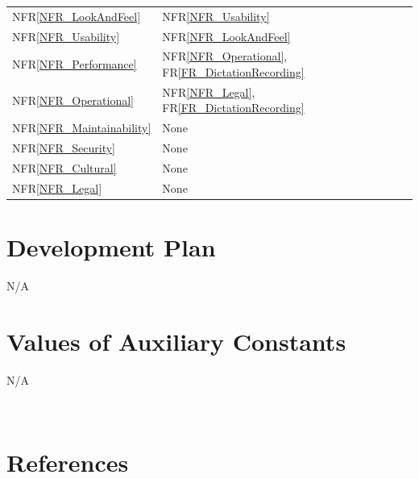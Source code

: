 \documentclass[12pt]{article}
\begin{document}
\begin{tabularx}{\textwidth}{p{3cm}p{2cm}X}
  NFR\ref{NFR_LookAndFeel} & NFR\ref{NFR_Usability} \\  

  NFR\ref{NFR_Usability} &  NFR\ref{NFR_LookAndFeel} \\  

  NFR\ref{NFR_Performance} & NFR\ref{NFR_Operational}, FR\ref{FR_DictationRecording} \\  

  NFR\ref{NFR_Operational} & NFR\ref{NFR_Legal}, FR\ref{FR_DictationRecording} \\  

  NFR\ref{NFR_Maintainability} & None \\  

  NFR\ref{NFR_Security} & None \\  

  NFR\ref{NFR_Cultural} & None \\  

  NFR\ref{NFR_Legal} & None \\ 

  \bottomrule 

  \end{tabularx} 
\section{Development Plan}
N/A

\section{Values of Auxiliary Constants}
N/A


~\newpage

\section{References}
\end{document}

